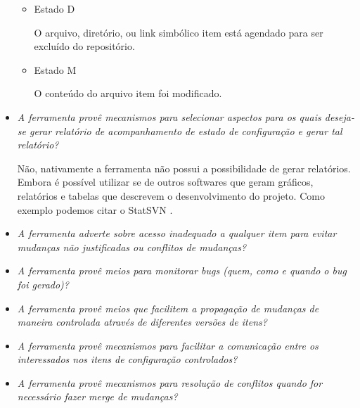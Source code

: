 \begin{itemize}
\begin{itemize}
          \item Estado D

          O arquivo, diretório, ou link simbólico item está agendado para ser excluído do repositório.

          \item Estado M

          O conteúdo do arquivo item foi modificado.
        \end{itemize}

  \item \textit{A ferramenta provê mecanismos para selecionar aspectos para os quais deseja-se gerar relatório
  de acompanhamento de estado de configuração e gerar tal relatório?}

      Não, nativamente a ferramenta não possui a possibilidade de gerar relatórios. Embora é possível utilizar se de outros softwares que geram gráficos, relatórios e tabelas que descrevem o desenvolvimento do projeto. Como exemplo podemos citar o StatSVN \footnotemark. 

  \item \textit{A ferramenta adverte sobre acesso inadequado a qualquer item para evitar mudanças não justificadas
  ou conflitos de mudanças?}
  \item \textit{A ferramenta provê meios para monitorar bugs (quem, como e quando o bug foi gerado)?}
  \item \textit{A ferramenta provê meios que facilitem a propagação de mudanças de maneira controlada
  através de diferentes versões de itens?}
  \item \textit{A ferramenta provê mecanismos para facilitar a comunicação entre os interessados nos itens de
  configuração controlados?}
  \item \textit{A ferramenta provê mecanismos para resolução de conflitos quando for necessário fazer merge
  de mudanças?}
\end{itemize}

